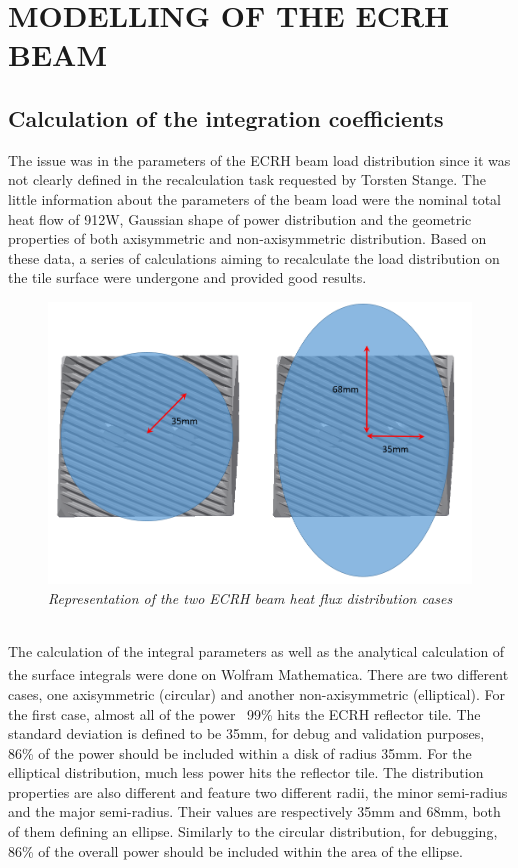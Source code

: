 \section{MODELLING OF THE ECRH BEAM}
\subsection{Calculation of the integration coefficients}
\normalsize{The issue was in the parameters of the \acrshort{ECRH} beam load distribution since it was not clearly defined in the recalculation task requested by Torsten Stange. The little information about the parameters of the beam load were the nominal total heat flow of 912W, Gaussian shape of power distribution and the geometric properties of both axisymmetric and non-axisymmetric distribution. Based on these data, a series of calculations aiming to recalculate the load distribution on the tile surface  were undergone and provided good results.}
\\
\begin{figure}[h!]
    \label{fig_4_1} 
    \centering
    \includegraphics[width=.9\textwidth]{figures/TWOBEAMDISTRI.png}
    \caption{\it Representation of the two ECRH beam heat flux distribution cases}
\end{figure}
\\
\normalsize{\indent The calculation of the integral parameters as well as the analytical calculation of the surface integrals were done on Wolfram Mathematica\textsuperscript{\textregistered}. There are two different cases, one axisymmetric (circular) and another non-axisymmetric (elliptical). For the first case, almost all of the power ~99\% hits the ECRH reflector tile. The standard deviation is defined to be 35mm, for debug and validation purposes, 86\% of the power should be included within a disk of radius 35mm. For the elliptical distribution, much less power hits the reflector tile. The distribution properties are also different and feature two different radii, the minor semi-radius and the major semi-radius. Their values are respectively 35mm and 68mm, both of them defining an ellipse. Similarly to the circular distribution, for debugging, 86\% of the overall power should be included within the area of the ellipse.}
